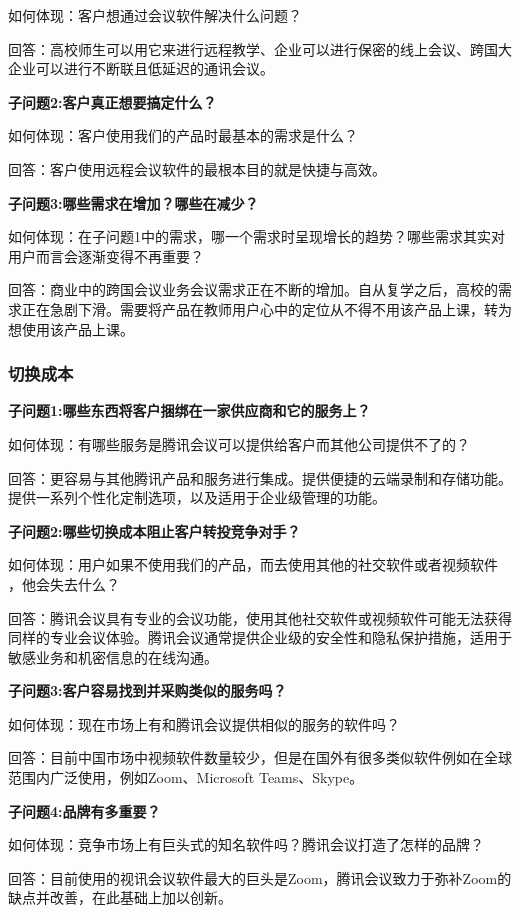 \documentclass[a4paper,12pt]{article}
\begin{document}
    如何体现：客户想通过会议软件解决什么问题？

    回答：⾼校师⽣可以⽤它来进⾏远程教学、企业可以进⾏保密的线上会议、跨国⼤企业可以进⾏不断联且低延迟的通讯会议。
    
    \textbf{子问题2:客户真正想要搞定什么？}

    如何体现：客户使⽤我们的产品时最基本的需求是什么？

    回答：客户使⽤远程会议软件的最根本⽬的就是快捷与⾼效。

    \textbf{子问题3:哪些需求在增加？哪些在减少？}

    如何体现：在⼦问题1中的需求，哪⼀个需求时呈现增⻓的趋势？哪些需求其实对⽤户⽽⾔会逐渐变得不再重要？

    回答：商业中的跨国会议业务会议需求正在不断的增加。⾃从复学之后，⾼校的需求正在急剧下滑。需要将产品在教师⽤户⼼中的定位从不得不⽤该产品上课，转为想使⽤该产品上课。
    
    \subsubsection{切换成本}
    \textbf{子问题1:哪些东西将客户捆绑在一家供应商和它的服务上？}

    如何体现：有哪些服务是腾讯会议可以提供给客户⽽其他公司提供不了的？

    回答：更容易与其他腾讯产品和服务进行集成。提供便捷的云端录制和存储功能。提供一系列个性化定制选项，以及适用于企业级管理的功能。

    \textbf{子问题2:哪些切换成本阻止客户转投竞争对手？}

    如何体现：⽤户如果不使⽤我们的产品，⽽去使⽤其他的社交软件或者视频软件 ，他会失去什么？

    回答：腾讯会议具有专业的会议功能，使用其他社交软件或视频软件可能无法获得同样的专业会议体验。腾讯会议通常提供企业级的安全性和隐私保护措施，适用于敏感业务和机密信息的在线沟通。


    \textbf{子问题3:客户容易找到并采购类似的服务吗？}

    如何体现：现在市场上有和腾讯会议提供相似的服务的软件吗？

    回答：目前中国市场中视频软件数量较少，但是在国外有很多类似软件例如在全球范围内广泛使用，例如Zoom、Microsoft Teams、Skype。

    \textbf{子问题4:品牌有多重要？}

    如何体现：竞争市场上有巨头式的知名软件吗？腾讯会议打造了怎样的品牌？

    回答：⽬前使⽤的视讯会议软件最⼤的巨头是Zoom，腾讯会议致⼒于弥补Zoom的缺点并改善，在此基础上加以创新。
\end{document}
